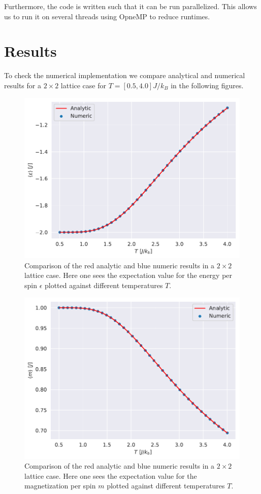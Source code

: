\documentclass[english,notitlepage,reprint,nofootinbib]{revtex4-1}  %
\begin{document}
Furthermore, the code is written such that it can be run parallelized. This allows us to run it on several threads using OpneMP to reduce runtimes.

\section{Results}\label{sec:results}
To check the numerical implementation we compare analytical and numerical results for a $2 \times 2$ lattice case for $T=[0.5,4.0]J/k_B$ in the following figures.
\begin{figure}[H]
    \centering
    \includegraphics[width=.5\textwidth]{../figures/numeric_analytic_e_T.pdf}
    \caption{Comparison of the red analytic and blue numeric results in a $2 \times 2$ lattice case. Here one sees the expectation value for the energy per spin $\epsilon$ plotted against different temperatures $T$.}
    \label{fig:numeric_analytic_e_T}
\end{figure}

\begin{figure}[H]
    \centering
    \includegraphics[width=.5\textwidth]{../figures/numeric_analytic_m_T.pdf}
    \caption{Comparison of the red analytic and blue numeric results in a $2 \times 2$ lattice case. Here one sees the expectation value for the magnetization per spin $m$ plotted against different temperatures $T$.}
    \label{fig:numeric_analytic_m_T}
\end{figure}
\end{document}
